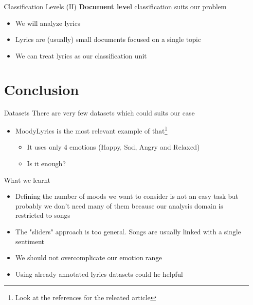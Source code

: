 \documentclass[xcolor=dvipsnames]{beamer}
\begin{document}
\begin{frame}{Classification Levels (II)}
\textbf{Document level} classification suits our problem
\begin{itemize}
\item We will analyze lyrics
\item Lyrics are (usually) small documents focused on a single topic
\item We can treat lyrics as our classification unit
\end{itemize}
\end{frame}



\section{Conclusion}

\begin{frame}{Datasets}
There are very few datasets which could suits our case
\begin{itemize}
\item MoodyLyrics is the most relevant example of that\footnote{Look at the references for the releated article}
\begin{itemize}
\item It uses only 4 emotions (Happy, Sad, Angry and Relaxed)
\item Is it enough?
\end{itemize}
\end{itemize}
\end{frame}


\begin{frame}{What we learnt}
\begin{itemize}
\item Defining the number of moods we want to consider is not an easy task but probably we don't
	need many of them because our analysis domain is restricted to songs
\item The "sliders" approach is too general. Songs are usually linked with a single sentiment
\item We should not overcomplicate our emotion range
\item Using already annotated lyrics datasets could he helpful
\end{itemize}
\end{frame}

\end{document}
